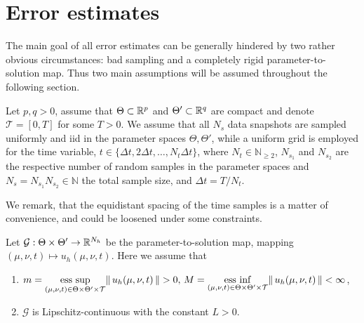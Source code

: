 \chapter{Error estimates} \label{section: Error estimates}


The main goal of all error estimates can be generally hindered by two rather obvious circumstances: bad sampling and a completely rigid parameter-to-solution map. Thus two main assumptions will be assumed throughout the following section.

\begin{assumption} \label{assumption sample}
    Let $p,q > 0$, assume that $\Theta \subset \mathbb{R}^p$ and $\Theta' \subset \mathbb{R}^q$ are compact and denote $\mathcal{T} = [0, T]$ for some $T > 0$. We assume that all $N_s$ data snapshots are sampled uniformly and iid in the parameter spaces $\Theta, \Theta'$, while a uniform grid is employed for the time variable, $t \in \{\Delta t, 2 \Delta t, \dots, N_t \Delta t \}$, where $N_t \in \mathbb{N}_{\geq 2}$, $N_{s_1}$ and $N_{s_2}$ are the respective number of random samples in the parameter spaces and $N_s = N_{s_1} N_{s_2} \in \mathbb{N}$ the total sample size, and $\Delta t = T / N_t$.
\end{assumption}

We remark, that the equidistant spacing of the time samples is a matter of convenience, and could be loosened under some constraints.

\begin{assumption} \label{assumption parameter-to-solution map}
    Let $\mathcal{G}: \Theta \times \Theta' \to \mathbb{R}^{N_h}$ be the parameter-to-solution map, mapping $(\mu, \nu, t) \mapsto u_h(\mu, \nu, t)$. Here we assume that
    \begin{enumerate}
        \item $m = 
        \underset{(\mu, \nu, t) \in \Theta \times \Theta' \times \mathcal{T}}{\operatorname{ess}\, \sup}\lVert \, u_h(\mu, \nu, t) \, \rVert > 0, \, M = 
        \underset{(\mu, \nu, t) \in \Theta \times \Theta' \times \mathcal{T}}{\operatorname{ess}\, \inf}\lVert \, u_h(\mu, \nu, t) \, \rVert < \infty$,
        \item $\mathcal{G}$ is Lipschitz-continuous with the constant $L > 0$.
    \end{enumerate}
\end{assumption}

